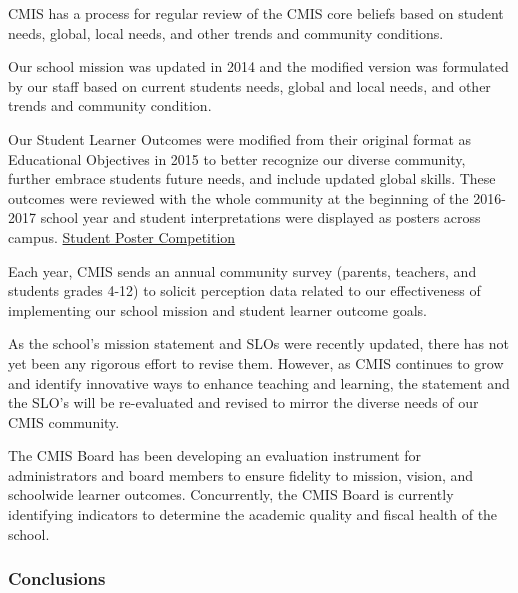 \begin{findings}
CMIS has a process for regular review of the CMIS core beliefs based on student needs, global, local needs, and other trends and community conditions.

Our school mission was updated in 2014 and the modified version was formulated by our staff based on current students needs, global and local needs, and other trends and community condition. 

Our Student Learner Outcomes were modified from their original format as Educational Objectives in 2015 to better recognize our diverse community, further embrace students future needs, and include updated global skills. These outcomes were reviewed with the whole community at the beginning of the 2016-2017 school year and student interpretations were displayed as posters across campus. \href{https://docs.google.com/a/cmis.ac.th/presentation/d/1bdi1LZUjWbGKOyB0XR9CGyoY2xLY39SZVKhiHTIJGxc/edit?usp=sharing}{Student Poster Competition}

Each year, CMIS sends an annual community survey (parents, teachers, and students grades 4-12) to solicit perception data related to our effectiveness of implementing our school mission and student learner outcome goals.


As the school’s mission statement and SLOs were recently updated, there has not yet been any rigorous effort to revise them.  However, as CMIS continues to grow and identify innovative ways to enhance teaching and learning, the statement and the SLO’s will be re-evaluated and revised to mirror the diverse needs of our CMIS community.

The CMIS Board has been developing an evaluation instrument for administrators and board members to ensure fidelity to mission, vision, and schoolwide learner outcomes.  Concurrently, the CMIS Board is currently identifying indicators to determine the academic quality and fiscal health of the school. 
\end{findings}

\subsubsection{Conclusions}


